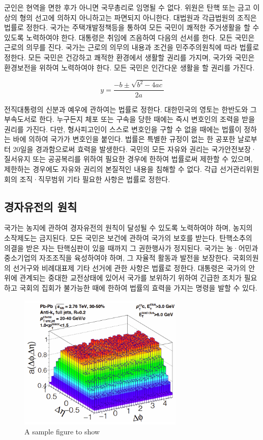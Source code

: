 \documentclass[master, korean]{pnuthesis}
\begin{document}
군인은 현역을 면한 후가 아니면 국무총리로 임명될 수 없다. 위원은 탄핵 또는 금고 이상의 형의 선고에 의하지 아니하고는 파면되지 아니한다. 대법원과 각급법원의 조직은 법률로 정한다. 국가는 주택개발정책등을 통하여 모든 국민이 쾌적한 주거생활을 할 수 있도록 노력하여야 한다. 대통령은 취임에 즈음하여 다음의 선서를 한다. 모든 국민은 근로의 의무를 진다. 국가는 근로의 의무의 내용과 조건을 민주주의원칙에 따라 법률로 정한다. 모든 국민은 건강하고 쾌적한 환경에서 생활할 권리를 가지며, 국가와 국민은 환경보전을 위하여 노력하여야 한다. 모든 국민은 인간다운 생활을 할 권리를 가진다.

\begin{equation}
	y = \frac{-b \pm \sqrt{b^2-4ac}}{2a}
\end{equation}

전직대통령의 신분과 예우에 관하여는 법률로 정한다. 대한민국의 영토는 한반도와 그 부속도서로 한다. 누구든지 체포 또는 구속을 당한 때에는 즉시 변호인의 조력을 받을 권리를 가진다. 다만, 형사피고인이 스스로 변호인을 구할 수 없을 때에는 법률이 정하는 바에 의하여 국가가 변호인을 붙인다. 법률은 특별한 규정이 없는 한 공포한 날로부터 20일을 경과함으로써 효력을 발생한다. 국민의 모든 자유와 권리는 국가안전보장·질서유지 또는 공공복리를 위하여 필요한 경우에 한하여 법률로써 제한할 수 있으며, 제한하는 경우에도 자유와 권리의 본질적인 내용을 침해할 수 없다. 각급 선거관리위원회의 조직·직무범위 기타 필요한 사항은 법률로 정한다.

\subsection{경자유전의 원칙}

국가는 농지에 관하여 경자유전의 원칙이 달성될 수 있도록 노력하여야 하며, 농지의 소작제도는 금지된다. 모든 국민은 보건에 관하여 국가의 보호를 받는다. 탄핵소추의 의결을 받은 자는 탄핵심판이 있을 때까지 그 권한행사가 정지된다. 국가는 농·어민과 중소기업의 자조조직을 육성하여야 하며, 그 자율적 활동과 발전을 보장한다. 국회의원의 선거구와 비례대표제 기타 선거에 관한 사항은 법률로 정한다. 대통령은 국가의 안위에 관계되는 중대한 교전상태에 있어서 국가를 보위하기 위하여 긴급한 조치가 필요하고 국회의 집회가 불가능한 때에 한하여 법률의 효력을 가지는 명령을 발할 수 있다.

\begin{figure}
	\centering
	\includegraphics[width=0.7\textwidth]{figure/samplefig1.png}
	\caption{A sample figure to show}
\end{figure}
\end{document}
